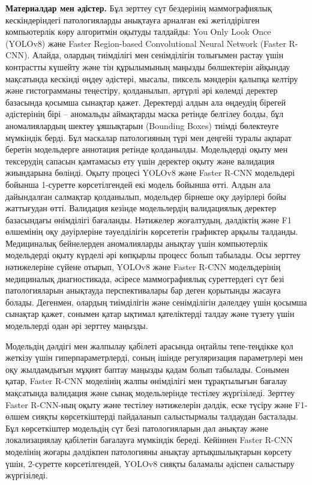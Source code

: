 \begin{multicols}{2}
{\bfseries Материалдар мен әдістер.} Бұл зерттеу сүт бездерінің
маммографиялық кескіндеріндегі патологияларды анықтауға арналған екі
жетілдірілген компьютерлік көру алгоритмін оқытуды талдайды: You Only
Look Once (YOLOv8) және Faster Region-based Convolutional Neural Network
(Faster R-CNN). Алайда, олардың тиімділігі мен сенімділігін толығымен
растау үшін контрастты күшейту және тін құрылымының маңызды бөлшектерін
айқындау мақсатында кескінді өңдеу әдістері, мысалы, пиксель мәндерін
қалыпқа келтіру және гистограмманы теңестіру, қолданылып, әртүрлі әрі
көлемді деректер базасында қосымша сынақтар қажет. Деректерді алдын ала
өңдеудің бірегей әдістерінің бірі -- аномальды аймақтарды маска ретінде
белгілеу болды, бұл аномалиялардың шектеу ұяшықтарын (Bounding Boxes)
тиімді бөлектеуге мүмкіндік берді. Бұл маскалар патологияның түрі мен
деңгейі туралы ақпарат беретін модельдерге аннотация ретінде қолданылды.
Модельдерді оқыту мен тексерудің сапасын қамтамасыз ету үшін деректер
оқыту және валидация жиындарына бөлінді. Оқыту процесі YOLOv8 және
Faster R-CNN модельдері бойынша 1-суретте көрсетілгендей екі модель
бойынша өтті. Алдын ала дайындалған салмақтар қолданылып, модельдер
бірнеше оқу дәуірлері бойы жаттығудан өтті. Валидация кезінде
модельлердің валидациялық деректер базасындағы өнімділігі бағаланды.
Нәтижелер жоғалтудың, дәлдіктің және F1 өлшемінің оқу дәуірлеріне
тәуелділігін көрсететін графиктер арқылы талданды. Медициналық
бейнелерден аномалияларды анықтау үшін компьютерлік модельдерді оқыту
күрделі әрі көпқырлы процесс болып табылады. Осы зерттеу нәтижелеріне
сүйене отырып, YOLOv8 және Faster R-CNN модельдерінің медициналық
диагностикада, әсіресе маммографиялық суреттердегі сүт безі
патологияларын анықтауда перспективалары бар деген қорытынды жасауға
болады. Дегенмен, олардың тиімділігін және сенімділігін дәлелдеу үшін
қосымша сынақтар қажет, сонымен қатар ықтимал қателіктерді талдау және
түзету үшін модельлерді одан әрі зерттеу маңызды.

Модельдің дәлдігі мен жалпылау қабілеті арасында оңтайлы тепе-теңдікке
қол жеткізу үшін гиперпараметрлерді, соның ішінде регуляризация
параметрлері мен оқу жылдамдығын мұқият баптау маңызды қадам болып
табылады. Сонымен қатар, Faster R-CNN моделінің жалпы өнімділігі мен
тұрақтылығын бағалау мақсатында валидация және сынақ модельлерінде
тестілеу жүргізіледі. Зерттеу Faster R-CNN-ның оқыту және тестілеу
нәтижелерін дәлдік, еске түсіру және F1-өлшем сияқты көрсеткіштерді
пайдаланып салыстырмалы талдаудан басталады. Бұл көрсеткіштер модельдің
сүт безі патологияларын дәл анықтау және локализациялау қабілетін
бағалауға мүмкіндік береді. Кейіннен Faster R-CNN моделінің жоғары
дәлдікпен патологияны анықтау артықшылықтарын көрсету үшін, 2-суретте
көрсетілгендей, YOLOv8 сияқты баламалы әдіспен салыстыру жүргізіледі.


\end{multicols}
